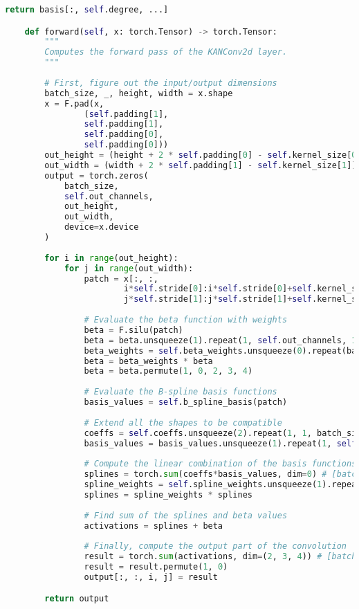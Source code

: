\begin{lstlisting}[language=Python]
        return basis[:, self.degree, ...]

    def forward(self, x: torch.Tensor) -> torch.Tensor:
        """
        Computes the forward pass of the KANConv2d layer.
        """
        
        # First, figure out the input/output dimensions
        batch_size, _, height, width = x.shape
        x = F.pad(x, 
                (self.padding[1], 
                self.padding[1], 
                self.padding[0], 
                self.padding[0]))
        out_height = (height + 2 * self.padding[0] - self.kernel_size[0]) // self.stride[0] + 1
        out_width = (width + 2 * self.padding[1] - self.kernel_size[1]) // self.stride[1] + 1
        output = torch.zeros(
            batch_size, 
            self.out_channels, 
            out_height, 
            out_width, 
            device=x.device
        )
        
        for i in range(out_height):
            for j in range(out_width):
                patch = x[:, :, 
                        i*self.stride[0]:i*self.stride[0]+self.kernel_size[0],
                        j*self.stride[1]:j*self.stride[1]+self.kernel_size[1]]
                
                # Evaluate the beta function with weights
                beta = F.silu(patch)
                beta = beta.unsqueeze(1).repeat(1, self.out_channels, 1, 1, 1)
                beta_weights = self.beta_weights.unsqueeze(0).repeat(batch_size, 1, 1, 1, 1)
                beta = beta_weights * beta
                beta = beta.permute(1, 0, 2, 3, 4)
                
                # Evaluate the B-spline basis functions
                basis_values = self.b_spline_basis(patch)
                
                # Extend all the shapes to be compatible
                coeffs = self.coeffs.unsqueeze(2).repeat(1, 1, batch_size, 1, 1, 1)
                basis_values = basis_values.unsqueeze(1).repeat(1, self.out_channels, 1, 1, 1, 1)
                
                # Compute the linear combination of the basis functions
                splines = torch.sum(coeffs*basis_values, dim=0) # [batch_size, out_channels, in_channels, kernel_size[0], kernel_size[1]]
                spline_weights = self.spline_weights.unsqueeze(1).repeat(1, batch_size, 1, 1, 1)
                splines = spline_weights * splines
                
                # Find sum of the splines and beta values
                activations = splines + beta
                
                # Finally, compute the output part of the convolution
                result = torch.sum(activations, dim=(2, 3, 4)) # [batch_size, out_channels, in_channels, kernel_size[0], kernel_size[1]]
                result = result.permute(1, 0)
                output[:, :, i, j] = result

        return output
\end{lstlisting}